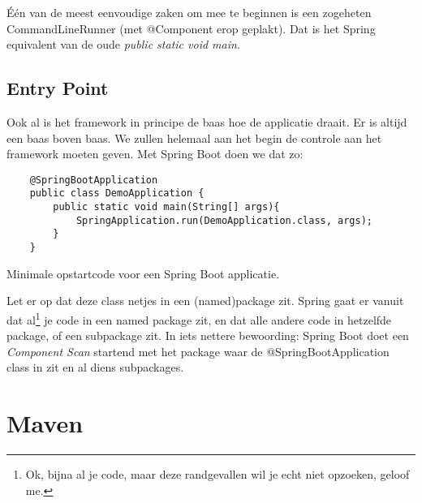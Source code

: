 Één van de meest eenvoudige zaken om mee te beginnen is een zogeheten CommandLineRunner (met @Component erop geplakt). 
Dat is het Spring equivalent van de oude \emph{public static void main}.

\subsection{Entry Point}

Ook al is het framework in principe de baas hoe de applicatie draait. Er is altijd een baas boven baas. 
We zullen helemaal aan het begin de controle aan het framework moeten geven. Met Spring Boot doen we dat zo:

\begin{listing}[H]
    \begin{verbatim}
    @SpringBootApplication
    public class DemoApplication {
        public static void main(String[] args){
            SpringApplication.run(DemoApplication.class, args);
        }
    }
    \end{verbatim}
    \caption{Minimale opstartcode voor een Spring Boot applicatie.}
    \label{code:springstart}
\end{listing}

Let er op dat deze class netjes in een (named)package zit. Spring gaat er vanuit dat 
al\footnote{Ok, bijna al je code, maar deze randgevallen wil je echt niet opzoeken, geloof me.} 
je code in een named package zit, en dat alle andere code in hetzelfde package, of een subpackage zit.
In iets nettere bewoording: Spring Boot doet een \emph{Component Scan} startend met het package waar 
de @SpringBootApplication class in zit en al diens subpackages.

\section{Maven}